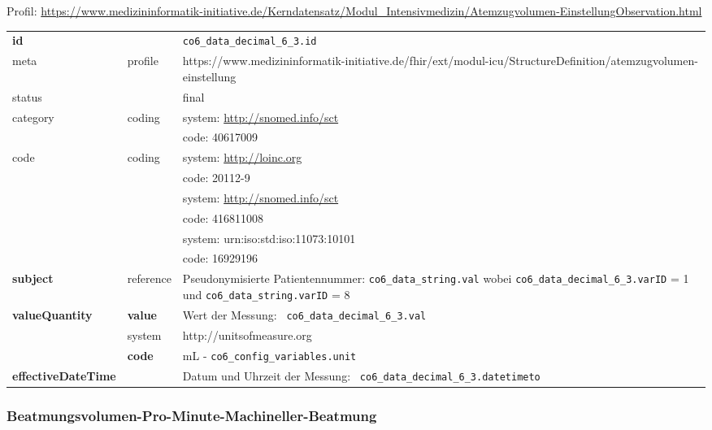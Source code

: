 Profil: \url{https://www.medizininformatik-initiative.de/Kerndatensatz/Modul_Intensivmedizin/Atemzugvolumen-EinstellungObservation.html}

\begin{longtable}{|l|l|p{7.5cm}|}
        \hline
        \rowcolor{lightgray} \multicolumn{3}{|l|}{Data Mapping (inhaltlich)} \\ \hline
        \textbf{id} &  & \texttt{co6\_data\_decimal\_6\_3.id} \\ \hline
	meta & profile & https://www.medizininformatik-initiative.de/fhir/ext/modul-icu/StructureDefinition/atemzugvolumen-einstellung \\ \hline 
	status &  & final   \\ \hline 
	category & coding & system: \url{http://snomed.info/sct} \\
\cline{3-3}
	& & code: 40617009 \\ \hline
	code & coding & system: \url{http://loinc.org} \\ 
	\cline{3-3} 
	 &  & code: 20112-9 \\ 
	 \cline{3-3} 
	 &  & system: \url{http://snomed.info/sct} \\ 
	 \cline{3-3} 
	 &  & code: 416811008 \\ 
	 \cline{3-3} 
	 &  & system: urn:iso:std:iso:11073:10101 \\ 
	 \cline{3-3}
	 &  & code: 16929196 \\ \hline
	 \textbf{subject} & reference & Pseudonymisierte Patientennummer: \texttt{co6\_data\_string.val} wobei \texttt{co6\_data\_decimal\_6\_3.varID} = 1 und \texttt{co6\_data\_string.varID} = 8 \\ \hline
	 \textbf{valueQuantity}  & \textbf{value} & Wert der Messung: \texttt{
co6\_data\_decimal\_6\_3.val} \\
        \cline{2-3}
         & system & http://unitsofmeasure.org \\
         \cline{2-3}
         & \textbf{code} & mL - \texttt{co6\_config\_variables.unit}
\\ \hline
     \textbf{effectiveDateTime}  & & Datum und Uhrzeit der Messung: \texttt{
co6\_data\_decimal\_6\_3.datetimeto} \\
     \hline
\end{longtable}


\subsubsection{Beatmungsvolumen-Pro-Minute-Machineller-Beatmung} 

